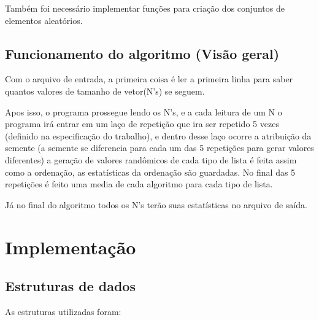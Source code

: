 \documentclass[11pt]{article}
\begin{document}
Também foi necessário implementar funções para criação dos conjuntos de elementos aleatórios.

\subsection{Funcionamento do algoritmo (Visão geral)}
\label{sec:org71febc1}
Com o arquivo de entrada, a primeira coisa é ler a primeira linha para saber quantos valores de tamanho de vetor(N's) se seguem. 

Apos isso, o programa prossegue lendo os N's, e a cada leitura de um N o programa irá entrar em um laço de repetição que ira ser repetido 5 vezes (definido na especificação do trabalho), e dentro desse laço ocorre a atribuição da semente (a semente se diferencia para cada um das 5 repetições para gerar valores diferentes) a geração de valores randômicos de cada tipo de lista é feita assim como a ordenação, as estatísticas da ordenação são guardadas. No final das 5 repetições é feito uma media de cada algoritmo para cada tipo de lista.

Já no final do algoritmo todos os N's terão suas estatísticas no arquivo de saída.

\newpage
\section{Implementação}
\label{sec:org217c4b1}
\subsection{Estruturas de dados}
\label{sec:orgd4efad6}
As estruturas utilizadas foram:
\end{document}
